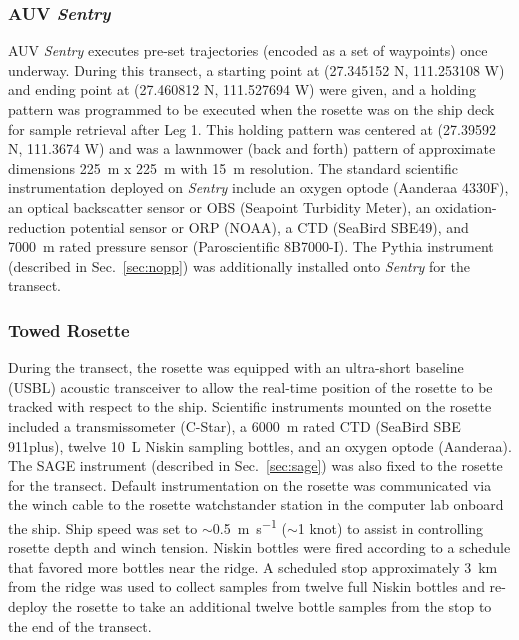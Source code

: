 \subsubsection{AUV \emph{Sentry}}
\label{sec:sentry}
AUV \emph{Sentry} executes pre-set trajectories (encoded as a set of waypoints) once underway. During this transect, a starting point at (27.345152 N, 111.253108 W) and ending point at (27.460812 N, 111.527694 W) were given, and a holding pattern was programmed to be executed when the rosette was on the ship deck for sample retrieval after Leg 1. This holding pattern was centered at (27.39592 N, 111.3674 W) and was a lawnmower (back and forth) pattern of approximate dimensions \SI{225}{\meter} x \SI{225}{\meter} with \SI{15}{\meter} resolution. The standard scientific instrumentation deployed on \emph{Sentry} include an oxygen optode (Aanderaa 4330F), an optical backscatter sensor or OBS (Seapoint Turbidity Meter), an oxidation-reduction potential sensor or ORP (NOAA), a CTD (SeaBird SBE49), and \SI{7000}{\meter} rated pressure sensor (Paroscientific 8B7000-I). The Pythia instrument (described in Sec.~\ref{sec:nopp}) was additionally installed onto \emph{Sentry} for the transect.

\subsubsection{Towed Rosette}
\label{sec:bottles}
During the transect, the rosette was equipped with an ultra-short baseline (USBL) acoustic transceiver to allow the real-time position of the rosette to be tracked with respect to the ship. Scientific instruments mounted on the rosette included a transmissometer (C-Star), a \SI{6000}{\meter} rated CTD (SeaBird SBE 911plus), twelve \SI{10}{\liter} Niskin sampling bottles, and an oxygen optode (Aanderaa). The SAGE instrument (described in Sec.~\ref{sec:sage}) was also fixed to the rosette for the transect. Default instrumentation on the rosette was communicated via the winch cable to the rosette watchstander station in the computer lab onboard the ship. Ship speed was set to $\sim$\SI{0.5}{\meter\per\second} ($\sim$1 knot) to assist in controlling rosette depth and winch tension. Niskin bottles were fired according to a schedule that favored more bottles near the ridge. A scheduled stop approximately \SI{3}{\kilo\meter} from the ridge was used to collect samples from twelve full Niskin bottles and re-deploy the rosette to take an additional twelve bottle samples from the stop to the end of the transect. 

